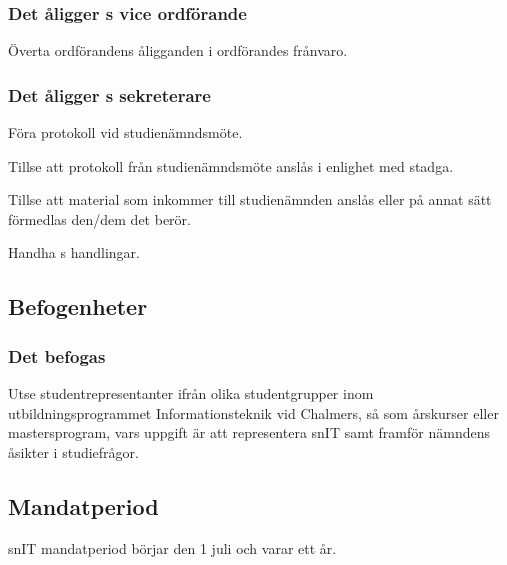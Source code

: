 \subsubsection{Det åligger \SNIT{}s vice ordförande}
\begin{att}
	\item Överta ordförandens åligganden i ordförandes frånvaro.
\end{att}

\subsubsection{Det åligger \SNIT{}s sekreterare}
\begin{att}
	\item Föra protokoll vid studienämndsmöte.
	\item Tillse att protokoll från studienämndsmöte anslås i enlighet med stadga.
	\item Tillse att material som inkommer till studienämnden anslås eller på annat sätt förmedlas den/dem det berör.
	\item Handha \SNIT{}s handlingar.
\end{att}

\subsection{Befogenheter}

\subsubsection{Det befogas \SNIT}
\begin{att}
	\item Utse studentrepresentanter ifrån olika studentgrupper inom utbildningsprogrammet Informationsteknik vid Chalmers, så som årskurser eller mastersprogram, vars uppgift är att representera snIT samt framför nämndens åsikter i studiefrågor.
\end{att}

\subsection{Mandatperiod}
snIT mandatperiod börjar den 1 juli och varar ett år.